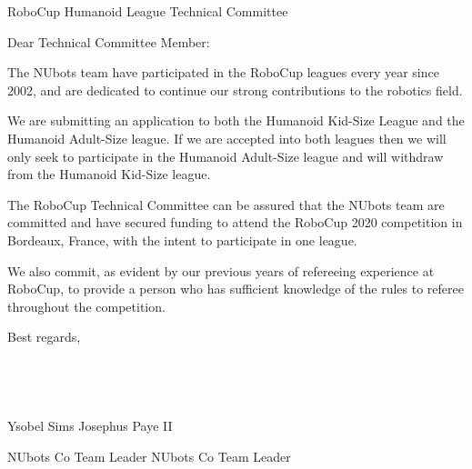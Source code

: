 \documentclass{letter}
\begin{document}
\begin{letter}{RoboCup Humanoid League Technical Committee}
\opening{Dear Technical Committee Member:}
The NUbots team have participated in the RoboCup leagues every year since 2002, and are dedicated to continue our strong contributions to the robotics field.

We are submitting an application to both the Humanoid Kid-Size League and the Humanoid Adult-Size league. If we are accepted into both leagues then we will only seek to participate in the Humanoid Adult-Size league and will withdraw from the Humanoid Kid-Size league.

The RoboCup Technical Committee can be assured that the NUbots team are committed and have secured funding to attend the RoboCup 2020 competition in Bordeaux, France, with the intent to participate in one league.

We also commit, as evident by our previous years of refereeing experience at RoboCup, to provide a person who has sufficient knowledge of the rules to referee throughout the competition.

Best regards, \\ \\ \\ \\ \\ 

\hspace*{20} Ysobel Sims \hspace*{100} Josephus Paye II

NUbots Co Team Leader \hspace*{50} NUbots Co Team Leader

\end{letter}
\end{document}
